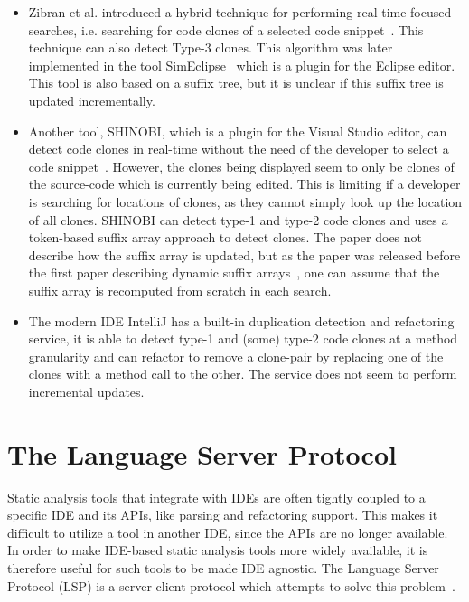\begin{itemize}

    \item Zibran et al. introduced a hybrid technique for performing real-time focused
        searches, i.e. searching for code clones of a selected code
        snippet~\cite{Zibran_real_time_search}. This technique can also detect Type-3
        clones. This algorithm was later implemented in the tool
        SimEclipse~\cite{Udding_Towards_Convenient_Management} which is a plugin for the
        Eclipse editor. This tool is also based on a suffix tree, but it is unclear if
        this suffix tree is updated incrementally.

    \item Another tool, SHINOBI, which is a plugin for the Visual Studio editor, can
        detect code clones in real-time without the need of the developer to select a code
        snippet~\cite{SHINOBI}. However, the clones being displayed seem to only be clones
        of the source-code which is currently being edited. This is limiting if a
        developer is searching for locations of clones, as they cannot simply look up the
        location of all clones. SHINOBI can detect type-1 and type-2 code clones and uses
        a token-based suffix array approach to detect clones. The paper does not describe
        how the suffix array is updated, but as the paper was released before the first
        paper describing dynamic suffix arrays~\cite{DynamicExtendedSuffixArrays}, one can
        assume that the suffix array is recomputed from scratch in each search.

    \item The modern IDE IntelliJ has a built-in duplication detection and refactoring
        service, it is able to detect type-1 and (some) type-2 code clones at a method
        granularity and can refactor to remove a clone-pair by replacing one of the clones
        with a method call to the other. The service does not seem to perform incremental
        updates.

\end{itemize}

\section{The Language Server Protocol}

Static analysis tools that integrate with IDEs are often tightly coupled to a specific IDE
and its APIs, like parsing and refactoring support. This makes it difficult to utilize a
tool in another IDE, since the APIs are no longer available. In order to make IDE-based
static analysis tools more widely available, it is therefore useful for such tools to be
made IDE agnostic. The Language Server Protocol (LSP) is a server-client protocol which
attempts to solve this problem~\cite{lsp}.

